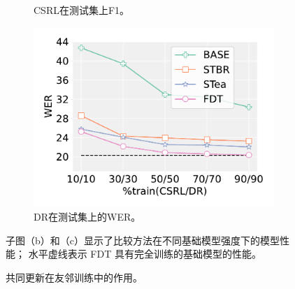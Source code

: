 \begin{figure}[!htbp]
\begin{subfigure}[t]{0.31\textwidth}
    \caption{CSRL在测试集上F1。}\label{fig:tea_csrl}
    \end{subfigure}
    \quad
    \begin{subfigure}[t]{0.31\textwidth}
    \centering
    \includegraphics[width=\textwidth]{pics/abla_initial_teacher_rewr.pdf}
    \caption{DR在测试集上的WER。}\label{fig:tea_rewr}
    \end{subfigure}

\caption{子图（b）和（c）显示了比较方法在不同基础模型强度下的模型性能； 水平虚线表示 FDT 具有完全训练的基础模型的性能。}
\end{figure}

\begin{figure}[!htbp]
\centering
    \centering
    \quad
    \centering
\caption{共同更新在友邻训练中的作用。}\label{fig:fixabl}
\end{figure}

